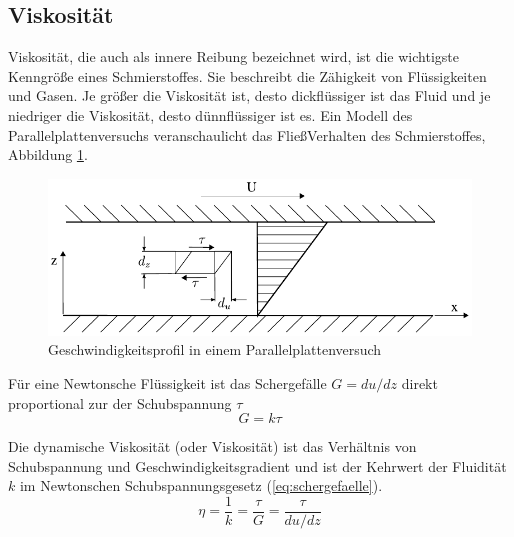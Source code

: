 \subsection*{Viskosität}
\label{sub:viskositaet}
Viskosität, die auch als innere Reibung bezeichnet wird, ist die wichtigste Kenngröße eines Schmierstoffes.
Sie beschreibt die Zähigkeit von Flüssigkeiten und Gasen.
Je größer die Viskosität ist, desto dickflüssiger ist das Fluid und je niedriger die Viskosität, desto dünnflüssiger ist es.
Ein Modell des Parallelplattenversuchs veranschaulicht das FließVerhalten des Schmierstoffes, Abbildung \ref{fig:geschwindigkeitsprofil_parallelplattenversuch}.
\begin{figure}[htb]
    \centering
    \includegraphics[]{./images/parallelplattenversuch.pdf}
    \caption{Geschwindigkeitsprofil in einem Parallelplattenversuch\cite{wisniewski}}
    \label{fig:geschwindigkeitsprofil_parallelplattenversuch}
\end{figure}

Für eine Newtonsche Flüssigkeit ist das Schergefälle $G = du/dz$ direkt proportional zur der Schubspannung $\tau$
\begin{equation}
    G = k  \tau
    \label{eq:schergefaelle}
\end{equation}

Die dynamische Viskosität (oder Viskosität) ist das Verhältnis von Schubspannung und Geschwindigkeitsgradient und ist der Kehrwert der Fluidität $k$ im Newtonschen Schubspannungsgesetz (\ref{eq:schergefaelle}).
\begin{equation}
    \eta = \frac{1}{k} = \frac{\tau}{G} = \frac{\tau}{du/dz}
    \label{eq:dynamische_viskositaet}
\end{equation}

